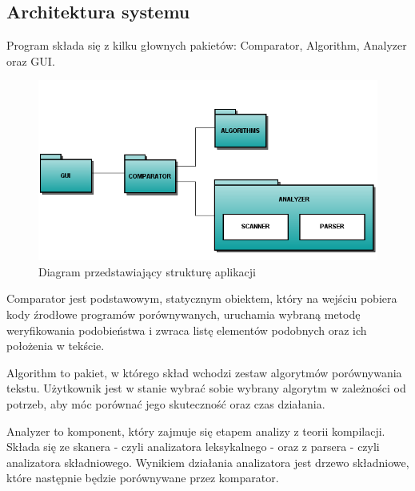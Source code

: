 \documentclass[a4paper,12pt]{article}
\begin{document}
\subsection{Architektura systemu}

Program składa się z kilku głownych pakietów: Comparator, Algorithm, Analyzer oraz GUI.

\begin{figure}[!h]
\centering
\includegraphics[scale=0.65]{gfx/packagediagram.png}
\caption{Diagram przedstawiający strukturę aplikacji}
\end{figure}

Comparator jest podstawowym, statycznym obiektem, który na wejściu pobiera kody źrodłowe programów porównywanych, uruchamia wybraną metodę weryfikowania podobieństwa i zwraca listę elementów podobnych oraz ich położenia w tekście.

Algorithm to pakiet, w którego skład wchodzi zestaw algorytmów porównywania tekstu. Użytkownik jest w stanie wybrać sobie wybrany algorytm w zależności od potrzeb, aby móc porównać jego skuteczność oraz czas działania.

Analyzer to komponent, który zajmuje się etapem analizy z teorii kompilacji. Składa się ze skanera - czyli analizatora leksykalnego - oraz z parsera - czyli analizatora składniowego. Wynikiem działania analizatora jest drzewo składniowe, które następnie będzie porównywane przez komparator.
\end{document}
